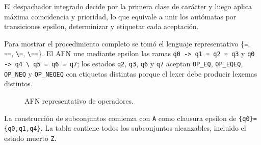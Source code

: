\documentclass[11pt,letterpaper]{article}
\newcommand{\code}[1]{{\ttfamily\small #1}}
\begin{document}
El despachador integrado decide por la primera clase de carácter y luego aplica máxima coincidencia y prioridad, lo que equivale a unir los autómatas por transiciones epsilon, determinizar y etiquetar cada aceptación.

Para mostrar el procedimiento completo se tomó el lenguaje representativo \{\texttt{=}, \texttt{==}, \texttt{\textbackslash=}, \texttt{\textbackslash==}\}. El AFN une mediante epsilon las ramas \texttt{q0 -> q1 = q2 = q3} y \texttt{q0 -> q4 \textbackslash{} q5 = q6 = q7}; los estados \texttt{q2}, \texttt{q3}, \texttt{q6} y \texttt{q7} aceptan \texttt{OP\_EQ}, \texttt{OP\_EQEQ}, \texttt{OP\_NEQ} y \texttt{OP\_NEQEQ} con etiquetas distintas porque el lexer debe producir lexemas distintos.

\begin{figure}[H]
  \centering
  \caption{AFN representativo de operadores.}
\end{figure}

La construcción de subconjuntos comienza con \texttt{A} como clausura epsilon de \texttt{\{q0\}=\{q0,q1,q4\}}. La tabla contiene todos los subconjuntos alcanzables, incluido el estado muerto \texttt{Z}.
\end{document}
